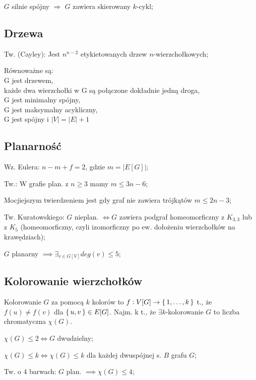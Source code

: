\entry
$G$ silnie spójny $\Rightarrow$ $G$ zawiera skierowany $k\text{-cykl}$;

\subsection{Drzewa}

\entry
Tw. (Cayley): Jest $n^{n-2}$ etykietowanych drzew $n$-wierzchołkowych;

\entry
Równoważne są:\\
G jest drzewem,\\
każde dwa wierzchołki w G są połączone dokładnie jedną droga,\\
G jest minimalny spójny,\\
G jest maksymalny acykliczny,\\
G jest spójny i $|V| = |E| + 1$ 

\subsection{Planarność}

\entry
Wz. Eulera: $n - m + f = 2$, gdzie $m = |E[G]|$;

\entry
Tw.: W grafie plan. z $n \geq 3$ mamy $m \leq 3n -6$;

\entry
Mocjiejszym twierdzeniem jest gdy graf nie zawiera trójkątów $m \leq 2n - 3$;

\entry
Tw. Kuratowskiego: $G$ nieplan. $\iff G$ zawiera podgraf homeomorficzny
  z $K_{3,3}$ lub z $K_5$ (homeomorficzny, czyli
  izomorficzny po ew. dołożeniu wierzchołków na krawędziach);

\entry
$G$ planarny $\implies \exists_{v \in G[V]} deg(v) \leq 5$;

\subsection{Kolorowanie wierzchołków}

\entry
Kolorowanie $G$ za pomocą $k$ kolorów to
  $f: V[G] \rightarrow \set{1, \dots, k}$ t., że $f(u) \neq f(v)$ dla
  $\set{u, v} \in E[G]$. Najm. k t., że $\exists k$-kolorowanie $G$ to liczba
  chromatyczna $\chi (G)$.

\entry
$\chi(G) \leq 2 \Leftrightarrow G$ dwudzielny;

\entry
$\chi(G) \leq k \Leftrightarrow \chi(G) \leq k$ dla każdej dwuspójnej s. $B$
  grafu $G$;

\entry
Tw. o 4 barwach: $G$ plan. $\implies\chi(G)\leq 4$;

